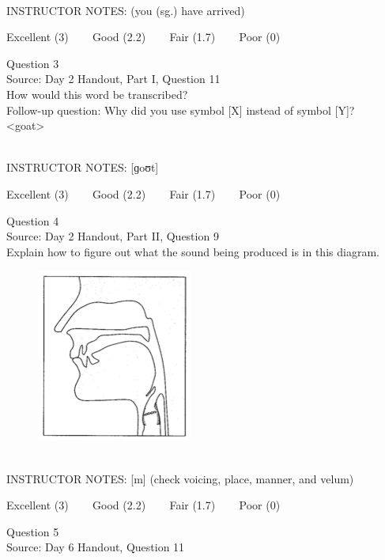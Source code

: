 \documentclass[12pt]{article}
\begin{document}
~\\
INSTRUCTOR NOTES: (you (sg.) have arrived)


\vfill
Excellent (3) ~~~ Good (2.2) ~~~ Fair (1.7) ~~~ Poor (0)
\newpage

{\large Question 3}\\

Source: Day 2 Handout, Part I, Question 11\\

How would this word be transcribed?\\ Follow-up question: Why did you use symbol [X] instead of symbol [Y]?\\

<goat>


~\\
INSTRUCTOR NOTES: [ɡoʊt]


\vfill
Excellent (3) ~~~ Good (2.2) ~~~ Fair (1.7) ~~~ Poor (0)
\newpage

{\large Question 4}\\

Source: Day 2 Handout, Part II, Question 9\\

Explain how to figure out what the sound being produced is in this diagram.\\

\begin{figure}[H]
\includegraphics{../images/sagittal_m.png}
\end{figure}

~\\
INSTRUCTOR NOTES: [m] (check voicing, place, manner, and velum)


\vfill
Excellent (3) ~~~ Good (2.2) ~~~ Fair (1.7) ~~~ Poor (0)
\newpage

{\large Question 5}\\

Source: Day 6 Handout, Question 11\\
\end{document}
